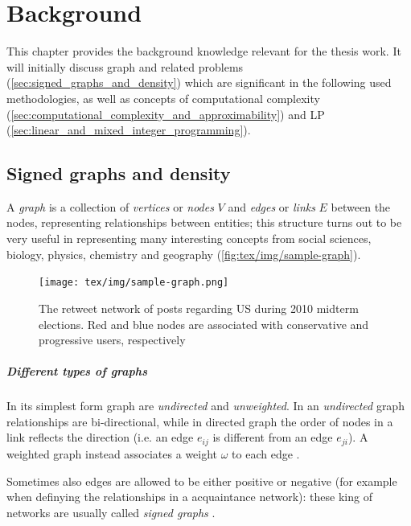 \chapter{Background}
\label{ch:background}

This chapter provides the background knowledge relevant for the thesis work. It
will initially discuss graph and related problems (\autoref{sec:signed_graphs_and_density}) which are significant in the
following used methodologies, as well as concepts of computational complexity
(\autoref{sec:computational_complexity_and_approximability}) and \acrlong{LP} (\autoref{sec:linear_and_mixed_integer_programming}).

\section{Signed graphs and density}%
\label{sec:signed_graphs_and_density}

A \emph{graph} is a collection of \emph{vertices} or \emph{nodes} $V$ and
\emph{edges} or \emph{links} $E$ between the nodes, representing relationships
between entities; this structure turns out to be very useful in
representing many interesting concepts from social sciences, biology, physics,
chemistry and geography (\autoref{fig:tex/img/sample-graph})\cite{Newman2018}\cite{Menczer2020}.

\begin{figure}
	\centering
	\texttt{[image: tex/img/sample-graph.png]}
	\caption{The retweet network of posts regarding US during 2010 midterm
		elections. Red and blue nodes are associated with conservative and
		progressive users, respectively \cite{Menczer2020}}%
	\label{fig:tex/img/sample-graph}
\end{figure}

\paragraph{Different types of graphs}%
\label{par:different_types_of_graphs}

In its simplest form graph are \emph{undirected} and \emph{unweighted}. In an
\emph{undirected} graph relationships are bi-directional, while in directed graph
the order of nodes in a link reflects the
direction (i.e. an edge $e_{ij} $ is different from an edge $e_{ji} $). A weighted
graph instead associates a weight $\omega $ to each edge
\cite{Menczer2020}\cite{AlbertLaszloNortheasternUniversity2016}.

Sometimes also edges are allowed to be either positive or negative (for example when
definying the relationships in a acquaintance network): these king of networks
are usually called \emph{signed graphs} \cite{Newman2018}.

